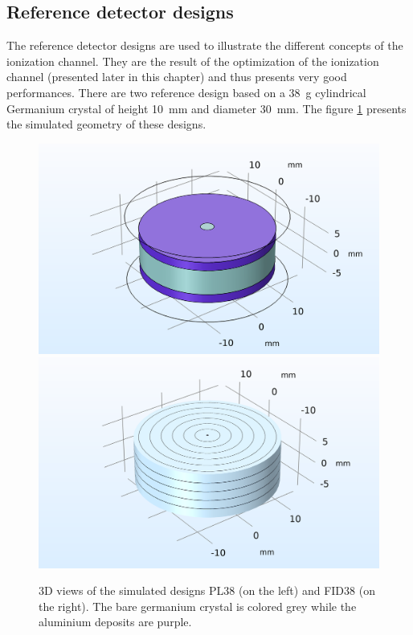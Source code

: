 \subsection{Reference detector designs}

The reference detector designs are used to illustrate the different concepts of the ionization channel. They are the result of the optimization of the ionization channel (presented later in this chapter) and thus presents very good performances. There are two reference design based on a \SI{38}{\g} cylindrical Germanium crystal of height \SI{10}{\mm} and diameter \SI{30}{\mm}. The figure \ref{fig:reference-design-3d} presents the simulated geometry of these designs.

\begin{figure}
\centering
\includegraphics[scale=0.5]{Figures/Electrodes/planar38_3d.png}
\includegraphics[scale=0.5]{Figures/Electrodes/fid38_3d.png}
\caption{3D views of the simulated designs PL38 (on the left) and FID38 (on the right). The bare germanium crystal is colored grey while the aluminium deposits are purple.}
\label{fig:reference-design-3d}
\end{figure}

